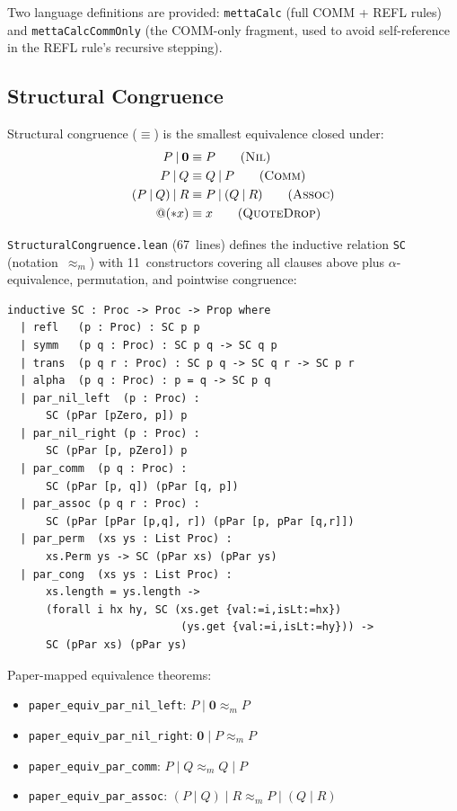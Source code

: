 \documentclass[11pt]{article}
\theoremstyle{definition}
\theoremstyle{remark}
\begin{document}
\noindent
Two language definitions are provided: \texttt{mettaCalc} (full COMM +
REFL rules) and \texttt{mettaCalcCommOnly} (the COMM-only fragment, used
to avoid self-reference in the REFL rule's recursive stepping).

\subsection{Structural Congruence}

Structural congruence ($\equiv$) is the smallest equivalence closed
under:
\begin{align}
  P \mathbin{|} \mathbf{0}  &\equiv P
    \tag{\textsc{Nil}} \\
  P \mathbin{|} Q            &\equiv Q \mathbin{|} P
    \tag{\textsc{Comm}} \\
  (P \mathbin{|} Q) \mathbin{|} R
                              &\equiv P \mathbin{|} (Q \mathbin{|} R)
    \tag{\textsc{Assoc}} \\
  @({*}x)                    &\equiv x
    \tag{\textsc{QuoteDrop}}
\end{align}

\texttt{StructuralCongruence.lean} (67~lines) defines the inductive
relation \texttt{SC} (notation~$\approx_m$) with 11~constructors
covering all clauses above plus $\alpha$-equivalence, permutation, and
pointwise congruence:

\begin{lstlisting}[caption={Structural congruence (from \texttt{StructuralCongruence.lean})}]
inductive SC : Proc -> Proc -> Prop where
  | refl   (p : Proc) : SC p p
  | symm   (p q : Proc) : SC p q -> SC q p
  | trans  (p q r : Proc) : SC p q -> SC q r -> SC p r
  | alpha  (p q : Proc) : p = q -> SC p q
  | par_nil_left  (p : Proc) :
      SC (pPar [pZero, p]) p
  | par_nil_right (p : Proc) :
      SC (pPar [p, pZero]) p
  | par_comm  (p q : Proc) :
      SC (pPar [p, q]) (pPar [q, p])
  | par_assoc (p q r : Proc) :
      SC (pPar [pPar [p,q], r]) (pPar [p, pPar [q,r]])
  | par_perm  (xs ys : List Proc) :
      xs.Perm ys -> SC (pPar xs) (pPar ys)
  | par_cong  (xs ys : List Proc) :
      xs.length = ys.length ->
      (forall i hx hy, SC (xs.get {val:=i,isLt:=hx})
                           (ys.get {val:=i,isLt:=hy})) ->
      SC (pPar xs) (pPar ys)
\end{lstlisting}

\noindent
Paper-mapped equivalence theorems:
\begin{itemize}
\item \texttt{paper\_equiv\_par\_nil\_left}: $P \mathbin{|} \mathbf{0} \approx_m P$
\item \texttt{paper\_equiv\_par\_nil\_right}: $\mathbf{0} \mathbin{|} P \approx_m P$
\item \texttt{paper\_equiv\_par\_comm}: $P \mathbin{|} Q \approx_m Q \mathbin{|} P$
\item \texttt{paper\_equiv\_par\_assoc}: $(P \mathbin{|} Q) \mathbin{|} R \approx_m P \mathbin{|} (Q \mathbin{|} R)$
\end{itemize}
\end{document}
